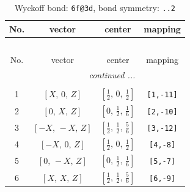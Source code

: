 \documentclass[fleqn,8pt]{jsarticle}
\begin{document}
\begin{longtable}{cccc}
\caption{Wyckoff bond: {\tt 6f@3d}, bond symmetry: {\tt ..2}}
 \\
 \hline \hline
No. & vector & center & mapping \\ \hline \endfirsthead

\multicolumn{3}{l}{\tablename\ \thetable{}} \\
 \hline \hline
No. & vector & center & mapping \\ \hline \endhead

 \hline \hline
\multicolumn{3}{r}{\footnotesize\it continued ...} \\ \endfoot

 \hline \hline
\multicolumn{3}{r}{} \\ \endlastfoot

1 & $\left[ X,\, 0,\, Z \right]$ & $\left[ \frac{1}{2},\, 0,\, \frac{1}{2} \right]$ & {\tt [1,-11]} \\ \hline
2 & $\left[ 0,\, X,\, Z \right]$ & $\left[ 0,\, \frac{1}{2},\, \frac{1}{6} \right]$ & {\tt [2,-10]} \\ \hline
3 & $\left[ - X,\, - X,\, Z \right]$ & $\left[ \frac{1}{2},\, \frac{1}{2},\, \frac{5}{6} \right]$ & {\tt [3,-12]} \\ \hline
4 & $\left[ - X,\, 0,\, Z \right]$ & $\left[ \frac{1}{2},\, 0,\, \frac{1}{2} \right]$ & {\tt [4,-8]} \\ \hline
5 & $\left[ 0,\, - X,\, Z \right]$ & $\left[ 0,\, \frac{1}{2},\, \frac{1}{6} \right]$ & {\tt [5,-7]} \\ \hline
6 & $\left[ X,\, X,\, Z \right]$ & $\left[ \frac{1}{2},\, \frac{1}{2},\, \frac{5}{6} \right]$ & {\tt [6,-9]} \\
\end{longtable}
\renewcommand{\arraystretch}{1.2}
\end{document}
